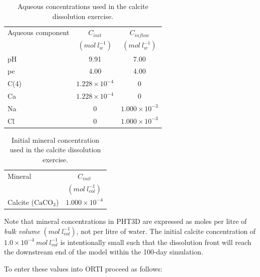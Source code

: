 \begin{table}[t]
\caption{Aqueous concentrations used in the calcite dissolution exercise.}
\begin{center}
\begin{tabular}{l c c}
\hline
Aqueous component & $C_{init}$ & $C_{inflow}$ \\
                  & $(mol\ l^{-1}_w)$ & $(mol\ l^{-1}_w)$ \\ \hline
pH   &  9.91                      &  7.00                      \\
pe   &  4.00                      &  4.00                      \\
C(4) &  $1.228 \times 10^{-4}$   &  0                         \\
Ca   &  $1.228 \times 10^{-4}$   &  0                         \\
Na   &  0                         &  $1.000 \times 10^{-3}$   \\
Cl   &  0                         &  $1.000 \times 10^{-3}$   \\ \hline
\end{tabular}
\label{calcite_aq}
\end{center}
\end{table}

\begin{table}[t]
\caption{Initial mineral concentration used in the calcite dissolution exercise.}
\begin{center}
\begin{tabular}{l c}
\hline
Mineral                  & $C_{init}$             \\
                         & $(mol\ l^{-1}_{vol})$  \\ \hline
Calcite ($\mathrm{CaCO_3}$) & $1.000 \times 10^{-4}$ \\ \hline
\end{tabular}
\label{calcite_min}
\end{center}
\end{table}

Note that mineral concentrations in PHT3D are expressed as moles per
litre of \textit{bulk volume} $(mol\ l^{-1}_{vol})$, not per litre of
water. The initial calcite concentration of $1.0 \times 10^{-4}\ mol\ l^{-1}_{vol}$ is intentionally small such that the dissolution front will reach the downstream end of the model within the 100-day simulation.

\noindent To enter these values into ORTI proceed as follows:

